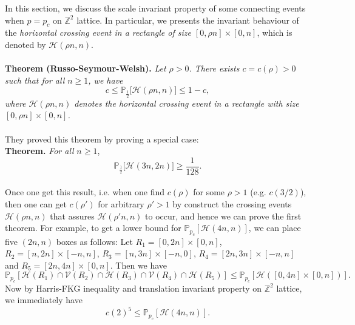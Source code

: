 \documentclass[12pt]{article}
\theoremstyle{plane}
\theoremstyle{definition}
\begin{document}
In this section, we discuss the scale invariant property of some connecting events when $p=p_c$ on $\mathbb{Z}^2$ lattice. In particular, we presents the invariant behaviour of the \textit{horizontal crossing event in a rectangle of size $[0,\rho n]\times[0,n]$}, which is denoted by $\mathcal{H}(\rho n, n)$.\\ \\
\textbf{Theorem (Russo-Seymour-Welsh).}
\textit{Let $\rho>0$. There exists $c=c(\rho)>0$ such that for all $n\geq 1$, we have}
\begin{equation*}
c\leq\mathbb{P}_{\frac{1}{2}}\big[\mathcal{H}(\rho n, n)\big]\leq 1-c,
\end{equation*}
\textit{where $\mathcal{H}(\rho n, n)$ denotes the horizontal crossing event in a rectangle with size $[0,\rho n]\times [0,n]$.}\\ \\
They proved this theorem by proving a special case:\\
\textbf{Theorem.} \textit{For all }$n\geq 1$,
\begin{equation*}
\mathbb{P}_{\frac{1}{2}}\big[\mathcal{H}(3n,2n)\big]\geq\frac{1}{128}.
\end{equation*}\\
Once one get this result, i.e. when one find $c(\rho)$ for some $\rho>1$ (e.g. $c(3/2)$), then one can get $c(\rho')$ for arbitrary $\rho'>1$ by construct the crossing events $\mathcal{H}(\rho n,n)$ that assures $\mathcal{H}(\rho'n, n)$ to occur, and hence we can prove the first theorem. For example, to get a lower bound for $\mathbb{P}_{p_c}[\mathcal{H}(4n,n)]$, we can place five $(2n,n)$ boxes as follows: Let $R_1=[0,2n]\times[0,n]$, $R_2=[n,2n]\times[-n,n]$, $R_3=[n,3n]\times[-n,0]$, $R_4=[2n,3n]\times[-n,n]$ and $R_5=[2n,4n]\times[0,n]$. Then we have
\begin{equation*}
\mathbb{P}_{p_c}[\mathcal{H}(R_1)\cap\mathcal{V}(R_2)\cap\mathcal{H}(R_3)\cap\mathcal{V}(R_4)\cap\mathcal{H}(R_5)]\leq\mathbb{P}_{p_c}[\mathcal{H}([0,4n]\times[0,n])].
\end{equation*}
Now by Harris-FKG inequality and translation invariant property on $\mathbb{Z}^2$ lattice, we immediately have
\begin{equation*}
c(2)^5\leq \mathbb{P}_{p_c}[\mathcal{H}(4n,n)].
\end{equation*}
\end{document}
